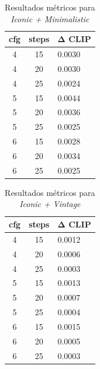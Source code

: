 \documentclass[12pt, %
openright, 
oneside, %
a4paper,    %
brazil]{facom-ufu-abntex2}
\begin{document}
\begin{table}[H]
\centering
\small
\setlength{\tabcolsep}{4pt}
\begin{tabularx}{\linewidth}{|c|c|X|}
\hline
\textbf{cfg} & \textbf{steps} & \(\boldsymbol{\Delta}\) \textbf{CLIP} \\ \hline
4 & 15 & 0.0030 \\ \hline
4 & 20 & 0.0030 \\ \hline
4 & 25 & 0.0024 \\ \hline
5 & 15 & 0.0044 \\ \hline
5 & 20 & 0.0036 \\ \hline
5 & 25 & 0.0025 \\ \hline
6 & 15 & 0.0028 \\ \hline
6 & 20 & 0.0034 \\ \hline
6 & 25 & 0.0025 \\ \hline
\end{tabularx}
\caption{Resultados métricos para \textit{Iconic + Minimalistic}}
\label{tab:metrics_ic_minimalistic}
\end{table}

\begin{table}[H]
\centering
\small
\setlength{\tabcolsep}{4pt}
\begin{tabularx}{\linewidth}{|c|c|X|}
\hline
\textbf{cfg} & \textbf{steps} & \(\boldsymbol{\Delta}\) \textbf{CLIP} \\ \hline
4 & 15 & 0.0012 \\ \hline
4 & 20 & 0.0006 \\ \hline
4 & 25 & 0.0003 \\ \hline
5 & 15 & 0.0013 \\ \hline
5 & 20 & 0.0007 \\ \hline
5 & 25 & 0.0004 \\ \hline
6 & 15 & 0.0015 \\ \hline
6 & 20 & 0.0005 \\ \hline
6 & 25 & 0.0003 \\ \hline
\end{tabularx}
\caption{Resultados métricos para \textit{Iconic + Vintage}}
\label{tab:metrics_ic_vintage}
\end{table}
\end{document}
